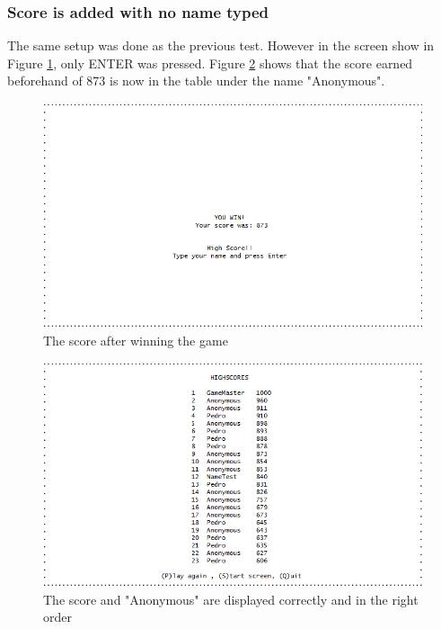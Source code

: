 \documentclass{article}
\begin{document}
\subsubsection*{Score is added with no name typed}
The same setup was done as the previous test. However in the screen show in Figure \ref{fig:hscore_test_noname}, only ENTER was pressed. Figure \ref{fig:hscore_test_noname2} shows that the score earned beforehand of 873 is now in the table under the name "Anonymous".
\begin{figure}[!ht]
	\begin{center}
	\includegraphics[width=0.6\paperwidth]{images/hscore_test_noname}
	\caption{The score after winning the game}
	\label{fig:hscore_test_noname} 
	\end{center}
\end{figure}
\begin{figure}[!ht]
	\begin{center}
	\includegraphics[width=0.6\paperwidth]{images/hscore_test_noname2}
	\caption{The score and "Anonymous" are displayed correctly and in the right order}
	\label{fig:hscore_test_noname2} 
	\end{center}
\end{figure}
\newpage
\end{document}
